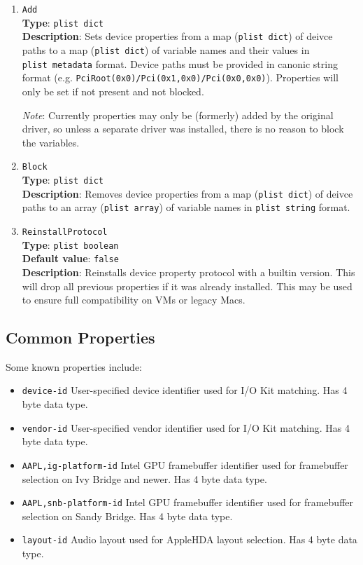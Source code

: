 \documentclass[]{article}
\providecommand{\tightlist}{%
  \setlength{\itemsep}{0pt}\setlength{\parskip}{0pt}}
\begin{document}
\begin{enumerate}
\item
  \texttt{Add}\\
  \textbf{Type}: \texttt{plist\ dict}\\
  \textbf{Description}: Sets device properties from a map (\texttt{plist\ dict})
  of deivce paths to a map (\texttt{plist\ dict}) of variable names and their values
  in \texttt{plist\ metadata} format. Device paths must be provided in canonic string
  format (e.g. \texttt{PciRoot(0x0)/Pci(0x1,0x0)/Pci(0x0,0x0)}). Properties will only
  be set if not present and not blocked.

  \emph{Note}: Currently properties may only be (formerly) added by the original driver,
  so unless a separate driver was installed, there is no reason to block the variables.

\item
  \texttt{Block}\\
  \textbf{Type}: \texttt{plist\ dict}\\
  \textbf{Description}: Removes device properties from a map (\texttt{plist\ dict})
  of deivce paths to an array (\texttt{plist\ array}) of variable names in
  \texttt{plist\ string} format.

\item
  \texttt{ReinstallProtocol}\\
  \textbf{Type}: \texttt{plist\ boolean}\\
  \textbf{Default value}: \texttt{false}\\
  \textbf{Description}: Reinstalls device property protocol with a builtin
  version. This will drop all previous properties if it was already installed.
  This may be used to ensure full compatibility on VMs or legacy Macs.

\end{enumerate}

\subsection{Common Properties}\label{devpropscommon}

Some known properties include:

\begin{itemize}
\tightlist
\item
  \texttt{device-id}
  \break
  User-specified device identifier used for I/O Kit matching. Has 4 byte data type.
\item
  \texttt{vendor-id}
  \break
  User-specified vendor identifier used for I/O Kit matching. Has 4 byte data type.
\item
  \texttt{AAPL,ig-platform-id}
  \break
  Intel GPU framebuffer identifier used for framebuffer selection on Ivy Bridge and newer.
  Has 4 byte data type.
\item
  \texttt{AAPL,snb-platform-id}
  \break
  Intel GPU framebuffer identifier used for framebuffer selection on Sandy Bridge.
  Has 4 byte data type.
\item
  \texttt{layout-id}
  \break
  Audio layout used for AppleHDA layout selection. Has 4 byte data type.
\end{itemize}
\end{document}
